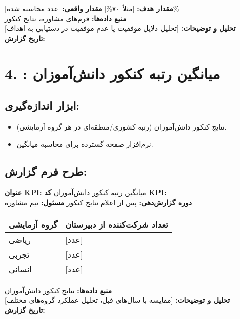 \documentclass[11pt]{article}
\begin{document}
\noindent\textbf{مقدار هدف:} {[مثلاً ۷۰\%]} \hfill \textbf{مقدار واقعی:} {[عدد محاسبه شده]\%} \\
\noindent\textbf{منبع داده‌ها:} فرم‌های مشاوره، نتایج کنکور \\
\noindent\textbf{تحلیل و توضیحات:} {[تحلیل دلایل موفقیت یا عدم موفقیت در دستیابی به اهداف]} \\
\noindent\textbf{تاریخ گزارش:} \\

\hrulefill
\bigskip

\section*{4. : میانگین رتبه کنکور دانش‌آموزان}

\subsection*{ابزار اندازه‌گیری:}
\begin{itemize}
    \item نتایج کنکور دانش‌آموزان (رتبه کشوری/منطقه‌ای در هر گروه آزمایشی).
    \item نرم‌افزار صفحه گسترده برای محاسبه میانگین.
\end{itemize}

\subsection*{طرح فرم گزارش:}
\noindent\textbf{عنوان KPI:} میانگین رتبه کنکور دانش‌آموزان \hfill \textbf{کد KPI:}  \\
\noindent\textbf{دوره گزارش‌دهی:} پس از اعلام نتایج کنکور \hfill \textbf{مسئول:} تیم مشاوره \\

\bigskip
\begin{tabular}{ll}
\textbf{گروه آزمایشی} & \textbf{تعداد شرکت‌کننده از دبیرستان} \\
\hline
ریاضی & {[عدد]} \\
تجربی & {[عدد]} \\
انسانی & {[عدد]} \\
\end{tabular}
\bigskip

\noindent\textbf{منبع داده‌ها:} نتایج کنکور دانش‌آموزان \\
\noindent\textbf{تحلیل و توضیحات:} {[مقایسه با سال‌های قبل، تحلیل عملکرد گروه‌های مختلف]} \\
\noindent\textbf{تاریخ گزارش:} \\
\end{document}
